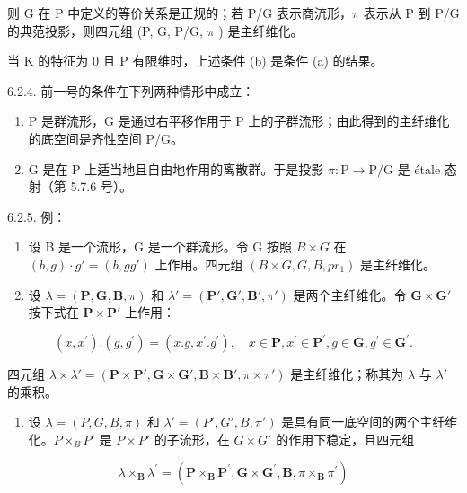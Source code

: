则 G 在 P 中定义的等价关系是正规的；若 P/G 表示商流形，\(\pi\) 表示从 P 到 P/G 的典范投影，则四元组 (P, G, P/G, \(\pi\) ) 是主纤维化。

当 K 的特征为 0 且 P 有限维时，上述条件 (b) 是条件 (a) 的结果。

6.2.4. 前一号的条件在下列两种情形中成立：

\begin{enumerate}
\def\labelenumi{(\alph{enumi})}
\item
  P 是群流形，G 是通过右平移作用于 P 上的子群流形；由此得到的主纤维化的底空间是齐性空间 P/G。
\item
  G 是在 P 上适当地且自由地作用的离散群。于是投影 \(\pi: \mathrm{P} \to \mathrm{P} / \mathrm{G}\) 是 étale 态射（第 5.7.6 号）。
\end{enumerate}

6.2.5. 例：

\begin{enumerate}
\def\labelenumi{(\alph{enumi})}
\item
  设 B 是一个流形，G 是一个群流形。令 G 按照 \(B \times G\) 在 \((b, g) \cdot g' = (b, gg')\) 上作用。四元组 \((B \times G, G, B, pr_{1})\) 是主纤维化。
\item
  设 \(\lambda = (\mathbf{P}, \mathbf{G}, \mathbf{B}, \pi)\) 和 \(\lambda' = (\mathbf{P}', \mathbf{G}', \mathbf{B}', \pi')\) 是两个主纤维化。令 \(\mathbf{G} \times \mathbf{G}'\) 按下式在 \(\mathbf{P} \times \mathbf{P}'\) 上作用：
\end{enumerate}

\[
(x, x ^ {\prime}). (g, g ^ {\prime}) = (x. g, x ^ {\prime}. g ^ {\prime}), \quad x \in \mathbf {P}, x ^ {\prime} \in \mathbf {P} ^ {\prime}, g \in \mathbf {G}, g ^ {\prime} \in \mathbf {G} ^ {\prime}.
\]

四元组 \(\lambda \times \lambda' = (\mathbf{P} \times \mathbf{P}', \mathbf{G} \times \mathbf{G}', \mathbf{B} \times \mathbf{B}', \pi \times \pi')\) 是主纤维化；称其为 \(\lambda\) 与 \(\lambda'\) 的乘积。

\begin{enumerate}
\def\labelenumi{(\alph{enumi})}
\setcounter{enumi}{2}
\tightlist
\item
  设 \(\lambda = (P, G, B, \pi)\) 和 \(\lambda' = (P', G', B, \pi')\) 是具有同一底空间的两个主纤维化。\(P \times_{B} P'\) 是 \(P \times P'\) 的子流形，在 \(G \times G'\) 的作用下稳定，且四元组
\end{enumerate}

\[
\lambda \times_ {\mathbf {B}} \lambda^ {\prime} = (\mathbf {P} \times_ {\mathbf {B}} \mathbf {P} ^ {\prime}, \mathbf {G} \times \mathbf {G} ^ {\prime}, \mathbf {B}, \pi \times_ {\mathbf {B}} \pi^ {\prime})
\]

